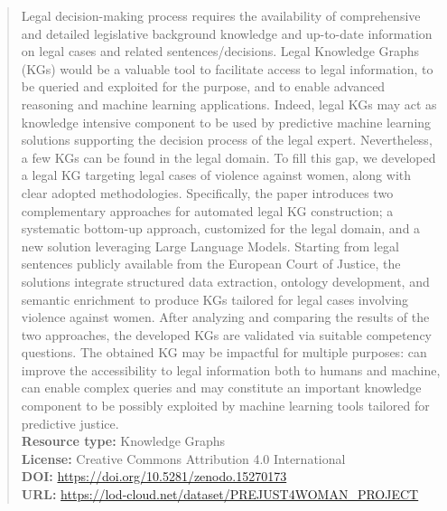 \documentclass[runningheads]{llncs}
\begin{document}
\begin{abstract}
Legal decision-making process requires the availability of comprehensive and detailed legislative background knowledge and %
up-to-date information on legal cases and related sentences/decisions. Legal Knowledge Graphs (KGs) would be a valuable tool to facilitate access to legal information, to be queried and exploited for the purpose, and to enable advanced reasoning and machine learning applications. %
Indeed, legal KGs may act as %
knowledge intensive component to be %
used by predictive machine learning solutions supporting the decision process of the legal expert. Nevertheless, a few KGs can be found in the legal domain. To fill this gap, %
we developed a legal KG targeting legal cases of violence against women, along with clear adopted methodologies. 
Specifically, the paper introduces two complementary %
approaches for automated legal KG construction; a systematic bottom-up approach, customized for the legal domain, and a new solution leveraging Large Language Models. Starting from legal sentences publicly available from the European Court of Justice, %
the solutions integrate structured data extraction, ontology development, and semantic enrichment to produce KGs tailored for legal cases involving violence against women. After analyzing and comparing the results of the two approaches, the developed KGs are validated via suitable competency questions. 
The obtained KG may be impactful for multiple purposes: can improve the accessibility to legal information both to humans and machine, can enable complex queries and may constitute an important knowledge component to be possibly exploited by machine learning tools tailored for predictive justice.\\ 
\textbf{Resource type:} Knowledge Graphs\\
\textbf{License:} Creative Commons Attribution 4.0 International \\
\textbf{DOI:} \url{https://doi.org/10.5281/zenodo.15270173} \\
\textbf{URL:} \url{https://lod-cloud.net/dataset/PREJUST4WOMAN\_PROJECT}
\end{abstract}
\end{document}
